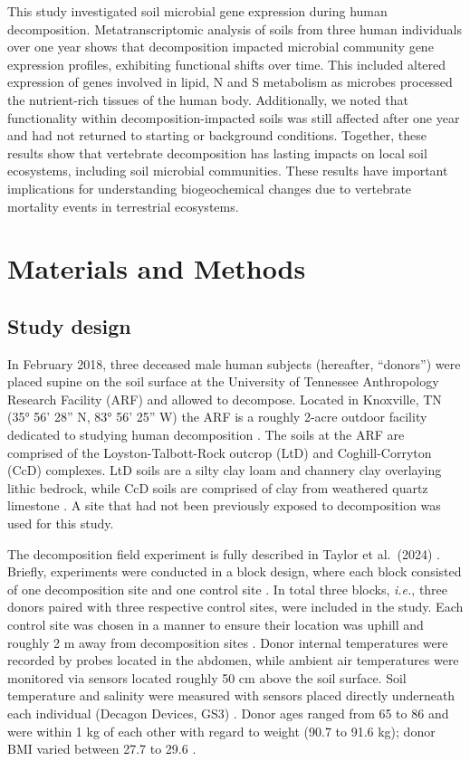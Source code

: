 \documentclass[
  sn-nature,
  lineno, referee]{sn-jnl}
\begin{document}
This study investigated soil microbial gene expression during human
decomposition. Metatranscriptomic analysis of soils from three human
individuals over one year shows that decomposition impacted microbial
community gene expression profiles, exhibiting functional shifts over
time. This included altered expression of genes involved in lipid, N and
S metabolism as microbes processed the nutrient-rich tissues of the
human body. Additionally, we noted that functionality within
decomposition-impacted soils was still affected after one year and had
not returned to starting or background conditions. Together, these
results show that vertebrate decomposition has lasting impacts on local
soil ecosystems, including soil microbial communities. These results
have important implications for understanding biogeochemical changes due
to vertebrate mortality events in terrestrial ecosystems.

\section{Materials and Methods}\label{materials-and-methods}

\subsection{Study design}\label{study-design}

In February 2018, three deceased male human subjects (hereafter,
``donors'') were placed supine on the soil surface at the University of
Tennessee Anthropology Research Facility (ARF) and allowed to decompose.
Located in Knoxville, TN (35° 56' 28'' N, 83° 56' 25'' W) the ARF is a
roughly 2-acre outdoor facility dedicated to studying human
decomposition \citep{keenan_spatial_2018}. The soils at the ARF are
comprised of the Loyston-Talbott-Rock outcrop (LtD) and Coghill-Corryton
(CcD) complexes. LtD soils are a silty clay loam and channery clay
overlaying lithic bedrock, while CcD soils are comprised of clay from
weathered quartz limestone
\citep{keenan_spatial_2018, taylor_transient_2024}. A site that had not
been previously exposed to decomposition was used for this study.

The decomposition field experiment is fully described in Taylor et
al.~(2024) \citep{taylor_transient_2024}. Briefly, experiments were
conducted in a block design, where each block consisted of one
decomposition site and one control site \citep{taylor_transient_2024}.
In total three blocks, \emph{i.e.}, three donors paired with three
respective control sites, were included in the study. Each control site
was chosen in a manner to ensure their location was uphill and roughly 2
m away from decomposition sites \citep{taylor_transient_2024}. Donor
internal temperatures were recorded by probes located in the abdomen,
while ambient air temperatures were monitored via sensors located
roughly 50 cm above the soil surface. Soil temperature and salinity were
measured with sensors placed directly underneath each individual
(Decagon Devices, GS3) \citep{taylor_transient_2024}. Donor ages ranged
from 65 to 86 and were within 1 kg of each other with regard to weight
(90.7 to 91.6 kg); donor BMI varied between 27.7 to 29.6
\citep{taylor_transient_2024}.
\end{document}
